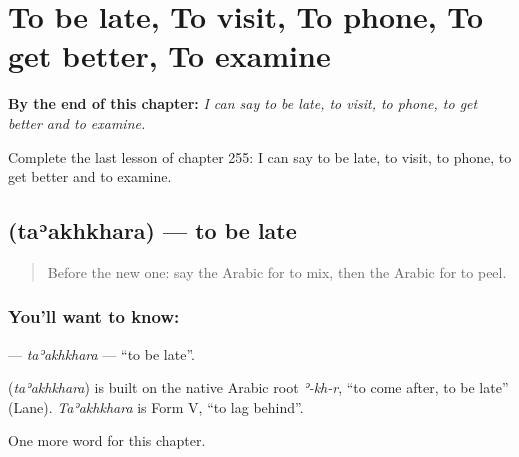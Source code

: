 
\chapter{To be late, To visit, To phone, To get better, To examine}
\label{ch:ar-to-be-late-to-visit-to-phone-to-get-better-to-examine}

\begin{chapteropening}
\textbf{By the end of this chapter:} \emph{I can say to be late, to visit, to phone, to get better and to examine.}

Complete the last lesson of chapter 255: I can say to be late, to visit, to phone, to get better and to examine.
\end{chapteropening}

\section[\texorpdfstring{\ar{تأخر} (taʾakhkhara)}{تأخر (taʾakhkhara)}]{ (taʾakhkhara) — to be late}

\label{lesson:AR-C255-taakhkhara}



\begin{quote}
Before the new one: say the Arabic for to mix, then the Arabic for to peel.
\end{quote}

\subsection*{You'll want to know: }
\textbf{} — \emph{taʾakhkhara} — \textquotedblleft{}to be late\textquotedblright{}.

\begin{cousinweb}
\textbf{} (\emph{taʾakhkhara}) is built on the native Arabic root \emph{ʾ-kh-r}, \textquotedblleft{}to come after, to be late\textquotedblright{} (Lane). \emph{Taʾakhkhara} is Form V, \textquotedblleft{}to lag behind\textquotedblright{}.
\end{cousinweb}

\begin{grammarlens}[title={What you've built}]
One more word for this chapter.
\end{grammarlens}

